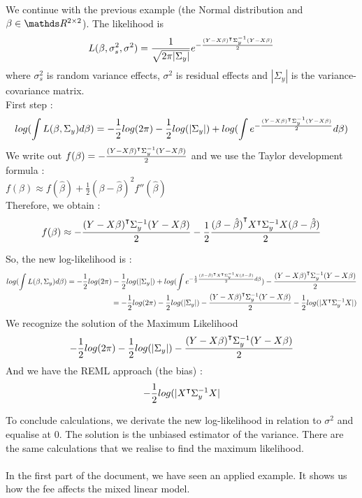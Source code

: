 \documentclass{article}
\begin{document}
\begin{exemple} 
We continue with the previous example (the Normal distribution and $\beta \in \bbR^{2\times 2}$). The likelihood is
\[L(\beta, \sigma_s^2, \sigma^2) = \frac{1}{\sqrt{2\pi |\Sigma_y|}}e^{-\frac{{(Y-X\beta)}^\intercal\Sigma_y^{-1}(Y-X\beta)}{2}}\]
where $\sigma_s^2$ is random variance effects, $\sigma^2$ is residual effects and $|\Sigma_y|$ is the variance-covariance matrix.\\
First step :
\[log(\int L(\beta, \Sigma_y)d\beta) = -\frac{1}{2}log(2\pi)-\frac{1}{2}log(|\Sigma_y|)+log(\int e^{-\frac{{(Y-X\beta)}^\intercal\Sigma_y^{-1}(Y-X\beta)}{2}} d\beta)\]
We write out $f(\beta) = -\frac{{(Y-X\beta)}^\intercal\Sigma_y^{-1}(Y-X\beta)}{2}$ and we use the Taylor development formula : \\
$f(\beta) \approx f(\hat{\beta}) + \frac{1}{2}(\beta - \hat{\beta})^2f''(\hat{\beta})$\\
Therefore, we obtain :
\[f(\beta) \approx -\frac{{(Y-X\beta)}^\intercal\Sigma_y^{-1}(Y-X\beta)}{2}-\frac{1}{2}\frac{{(\beta-\hat{\beta})}^\intercal {X}^\intercal \Sigma_y^{-1}X (\beta-\hat{\beta})}{2}\]

So, the new log-likelihood is :
\begin{equation*}
    \begin{split}
       log(\int L(\beta, \Sigma_y)d\beta) = -\frac{1}{2}log(2\pi)-\frac{1}{2}log(|\Sigma_y|)+log(\int e^{-\frac{1}{2}\frac{{(\beta-\hat{\beta})}^\intercal {X}^\intercal \Sigma_y^{-1}X (\beta-\hat{\beta})}{2} d\beta}) -\frac{{(Y-X\beta)}^\intercal\Sigma_y^{-1}(Y-X\beta)}{2}\\
       =-\frac{1}{2}log(2\pi)-\frac{1}{2}log(|\Sigma_y|)-\frac{{(Y-X\beta)}^\intercal\Sigma_y^{-1}(Y-X\beta)}{2} - \frac{1}{2}log(|{X}^\intercal\Sigma_y^{-1}X|)  
    \end{split}
\end{equation*}
We recognize the solution of the Maximum Likelihood
\[-\frac{1}{2}log(2\pi)-\frac{1}{2}log(|\Sigma_y|)-\frac{{(Y-X\beta)}^\intercal\Sigma_y^{-1}(Y-X\beta)}{2}\]
And we have the REML approach (the bias) : \[- \frac{1}{2}log(|{X}^\intercal \Sigma_y^{-1}X|\]
\end{exemple}
To conclude calculations, we derivate the new log-likelihood in relation to $\sigma^2$ and equalise at $0$. The solution is the unbiased estimator of the variance. There are the same calculations that we realise to find the maximum likelihood.\\
\\
In the first part of the document, we have seen an applied example. It shows us how the fee affects the mixed linear model.
\end{document}
